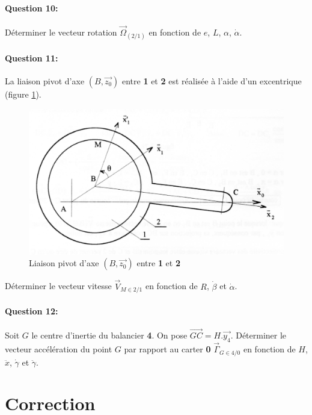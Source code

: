 \paragraph{Question 10:} Déterminer le vecteur rotation $\overrightarrow{\Omega}_{(2/1)}$ en fonction de $e$, $L$, $\alpha$, $\dot{\alpha}$.

\paragraph{Question 11:} La liaison pivot d'axe $(B, \overrightarrow{z_0})$ entre \textbf{1} et \textbf{2} est réalisée à l'aide d'un excentrique (figure \ref{commande_figure_4}).

\begin{figure}[!ht]
\begin{center}
\includegraphics[width=0.6\linewidth]{img/commande_figure_4}
\caption{Liaison pivot d'axe $(B, \vec{z_0})$ entre \textbf{1} et \textbf{2}}
\label{commande_figure_4}
\end{center}
\end{figure}

Déterminer le vecteur vitesse $\vec{V}_{M\in 2/1}$ en fonction de $R$, $\dot{\beta}$ et $\dot{\alpha}$.

\paragraph{Question 12:} Soit $G$ le centre d'inertie du balancier \textbf{4}. On pose $\overrightarrow{GC}=H.\overrightarrow{y_4}$.
Déterminer le vecteur accélération du point $G$ par rapport au carter \textbf{0} $\vec{\Gamma}_{G\in 4/0}$ en fonction de $H$, $\ddot{x}$, $\dot{\gamma}$ et $\ddot{\gamma}$.


\ifdef{\public}{}{}

\clearpage

\newpage

\section{Correction}

